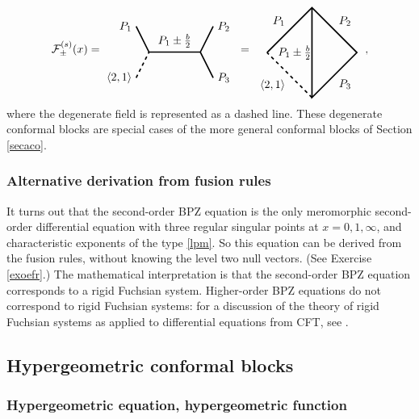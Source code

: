 \documentclass[12pt, a4paper, notitlepage, twoside]{report}
\numberwithin{equation}{section}
\theoremstyle{break}
\begin{document}
\begin{align}
 \mathcal{F}^{(s)}_\pm(x)  =  
 \begin{tikzpicture}[baseline=(current  bounding  box.center), very thick, scale = .4]
\draw (-1,2) node [left] {$P_1$} -- (0,0) -- node [above] {$P_1\pm \frac{b}{2}$} (4,0) -- (5,2) node [right] {$P_2$};
\draw[dashed] (-1,-2) node [left] {$\langle 2,1 \rangle$} -- (0,0);
\draw (4,0) -- (5,-2) node [right] {$P_3$};
\end{tikzpicture}
\ =\ 
\begin{tikzpicture}[baseline=(current  bounding  box.center), very thick, scale = .7]
\draw[dashed] (0, -2) -- node [below left] {$\langle 2,1 \rangle$} (-2, 0); 
\draw (-2, 0) -- node [above left] {$P_1$} (0, 2) -- node [above right] {$P_2$} (2, 0) -- node [below right] {$P_3$} (0, -2) -- node [left] {$P_1\pm \frac{b}{2}\! \! $} (0, 2); 
\end{tikzpicture}
\  \ ,
\label{gpic}
\end{align}
where the degenerate field is represented as a dashed line.
These degenerate conformal blocks are special cases of the more general conformal blocks of Section \ref{secaco}.

\subsubsection{Alternative derivation from fusion rules}

It turns out that the second-order BPZ equation is the only meromorphic second-order differential equation with three regular singular points at $x=0,1,\infty$, and characteristic exponents of the type \eqref{lpm}. So this equation can be derived from the fusion rules, without knowing the level two null vectors. (See Exercise \ref{exoefr}.) The mathematical interpretation is that the second-order BPZ equation corresponds to a rigid Fuchsian system. Higher-order BPZ equations do not correspond to rigid Fuchsian systems: for a discussion of the theory of rigid Fuchsian systems as applied to differential equations from CFT, see \cite{bhs17}. 


\subsection{Hypergeometric conformal blocks \label{sechcb}}

\subsubsection{Hypergeometric equation, hypergeometric function}
\end{document}
